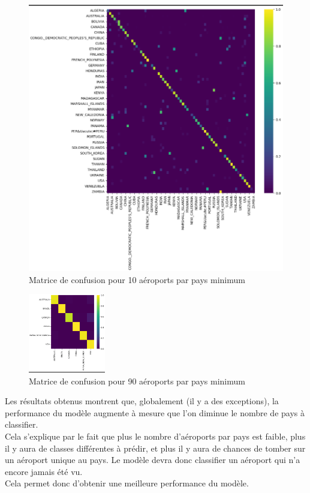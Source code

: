 \begin{figure}[h!]
    \centering
    \includegraphics[width=\textwidth]{content/img/matrix-f10.png}
    \caption{Matrice de confusion pour 10 aéroports par pays minimum}
    \label{fig:matrix-f10}
\end{figure}

\begin{figure}[h!]
    \centering
    \includegraphics[width=0.3\textwidth]{content/img/matrix-f90.png}
    \caption{Matrice de confusion pour 90 aéroports par pays minimum}
    \label{fig:matrix-f90}
\end{figure}

Les résultats obtenus montrent que, globalement (il y a des exceptions), la
performance du modèle augmente à mesure que l'on diminue le nombre de pays à
classifier.\\ Cela s'explique par le fait que plus le nombre d'aéroports par
pays est faible, plus il y aura de classes différentes à prédir, et plus il y
aura de chances de tomber sur un aéroport unique au pays. Le modèle devra donc
classifier un aéroport qui n'a encore jamais été vu.\\ Cela permet donc
d'obtenir une meilleure performance du modèle.\\

